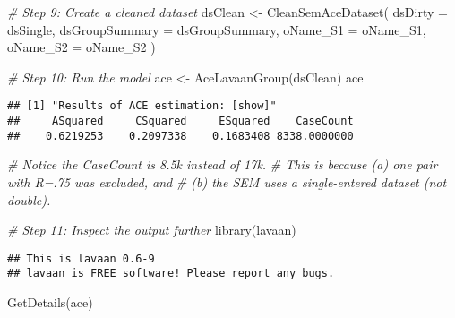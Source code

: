 \documentclass[smallextended]{svjour3}       %
\newenvironment{Shaded}{\begin{snugshade}}{\end{snugshade}}
\newcommand{\AttributeTok}[1]{\textcolor[rgb]{0.77,0.63,0.00}{#1}}
\newcommand{\CommentTok}[1]{\textcolor[rgb]{0.56,0.35,0.01}{\textit{#1}}}
\newcommand{\FunctionTok}[1]{\textcolor[rgb]{0.00,0.00,0.00}{#1}}
\newcommand{\NormalTok}[1]{#1}
\newcommand{\OtherTok}[1]{\textcolor[rgb]{0.56,0.35,0.01}{#1}}
\begin{document}
\begin{Shaded}
\begin{Highlighting}[]
\CommentTok{\# Step 9: Create a cleaned dataset}
\NormalTok{dsClean }\OtherTok{\textless{}{-}}
  \FunctionTok{CleanSemAceDataset}\NormalTok{(}
    \AttributeTok{dsDirty         =}\NormalTok{ dsSingle,}
    \AttributeTok{dsGroupSummary  =}\NormalTok{ dsGroupSummary,}
    \AttributeTok{oName\_S1        =}\NormalTok{ oName\_S1,}
    \AttributeTok{oName\_S2        =}\NormalTok{ oName\_S2}
\NormalTok{  )}

\CommentTok{\# Step 10: Run the model}
\NormalTok{ace }\OtherTok{\textless{}{-}} \FunctionTok{AceLavaanGroup}\NormalTok{(dsClean)}
\NormalTok{ace}
\end{Highlighting}
\end{Shaded}

\begin{verbatim}
## [1] "Results of ACE estimation: [show]"
##     ASquared     CSquared     ESquared    CaseCount 
##    0.6219253    0.2097338    0.1683408 8338.0000000
\end{verbatim}

\begin{Shaded}
\begin{Highlighting}[]
\CommentTok{\# Notice the CaseCount is 8.5k instead of 17k.}
\CommentTok{\#   This is because (a) one pair with R=.75 was excluded, and}
\CommentTok{\#   (b) the SEM uses a single{-}entered dataset (not double).}

\CommentTok{\# Step 11: Inspect the output further}
\FunctionTok{library}\NormalTok{(lavaan)}
\end{Highlighting}
\end{Shaded}

\begin{verbatim}
## This is lavaan 0.6-9
## lavaan is FREE software! Please report any bugs.
\end{verbatim}

\begin{Shaded}
\begin{Highlighting}[]
\FunctionTok{GetDetails}\NormalTok{(ace)}
\end{Highlighting}
\end{Shaded}
\end{document}
